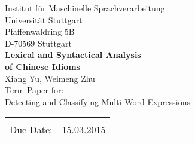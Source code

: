 \documentclass[12pt,leqno,a4paper]{article}
\newcommand{\Titel}{Lexical and Syntactical Analysis \\of Chinese Idioms}
\begin{document}
\begin{titlepage}
  \large
  \begin{center}
    Institut f\"ur Maschinelle Sprachverarbeitung\\
    Universit\"at Stuttgart\\
    Pfaffenwaldring 5B\\
    D-70569 Stuttgart\\    
      \vfill
    {\LARGE \bf \Titel} \\
    \vspace{2cm}
    Xiang Yu, Weimeng Zhu\\
    Term Paper for: \\
    Detecting and Classifying Multi-Word Expressions \\
      \vfill
    \begin{tabular}[t]{lr}
    \\
    \\
    {Due Date:} & 15.03.2015\\
    \end{tabular}
  \end{center}

  \normalsize
\end{titlepage}

\newpage
\thispagestyle{empty}










\tableofcontents
\newpage



















\end{document}
